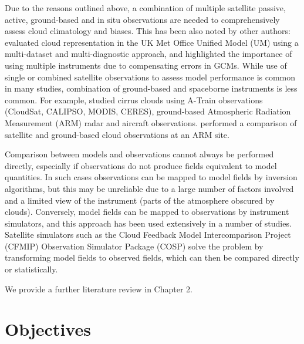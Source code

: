 Due to the reasons outlined above, a combination of multiple satellite passive, active,
ground-based and in situ observations are needed to comprehensively assess
cloud climatology and biases. This has been also noted by other authors:
\cite{williams2017} evaluated cloud representation in the UK Met Office
Unified Model (UM) using a multi-dataset and multi-diagnostic approach, and
highlighted the
importance of using multiple instruments due to compensating errors in GCMs.
While use of single or combined satellite observations to assess model
performance is common in many studies,
combination of ground-based and spaceborne instruments is less common.
For example, \cite{muhlbauer2015} studied cirrus clouds using A-Train
observations (CloudSat, CALIPSO, MODIS, CERES), ground-based
Atmospheric Radiation Measurement (ARM) radar and aircraft observations.
\cite{zhang2017} performed a comparison of satellite and ground-based cloud
observations at an ARM site.

Comparison between models and observations cannot always be performed directly,
especially if observations do not produce fields equivalent to model quantities.
In such cases observations can be mapped to model fields by inversion algorithms,
but this may be unreliable
due to a large number of factors involved and a limited view of the instrument
(parts of the atmosphere obscured by clouds).
Conversely, model fields can be mapped to observations by instrument simulators,
and this approach has been used extensively in a number of studies.
Satellite simulators such as the Cloud Feedback Model Intercomparison Project (CFMIP) Observation Simulator Package (COSP)
\citep{bodas-salcedo2011} solve the problem
by transforming model fields to observed fields, which can then
be compared directly or statistically.

We provide a further literature review in Chapter 2.

\section{Objectives}
\label{sec:objectives}

